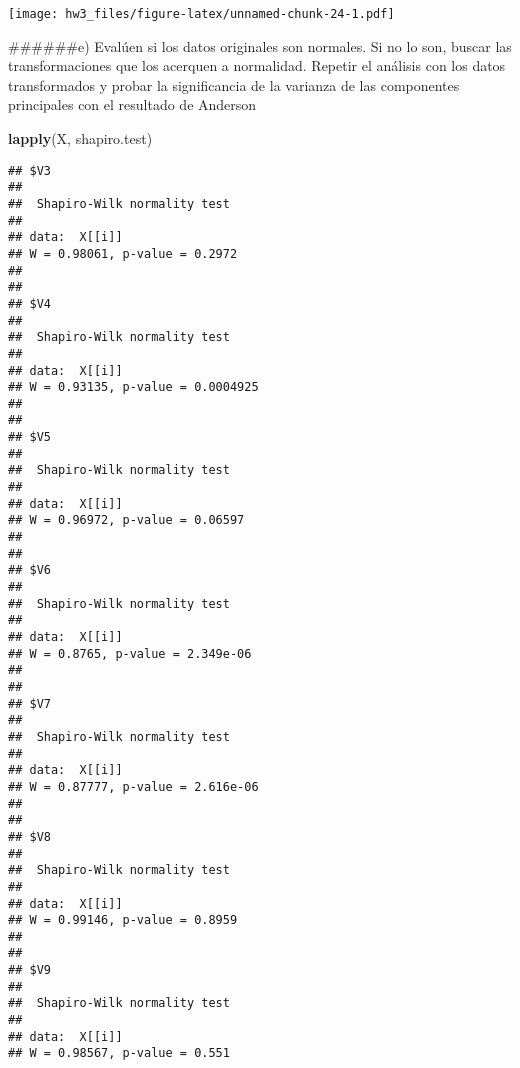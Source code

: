 \documentclass[]{article}
\newenvironment{Shaded}{\begin{snugshade}}{\end{snugshade}}
\newcommand{\ControlFlowTok}[1]{\textcolor[rgb]{0.13,0.29,0.53}{\textbf{#1}}}
\newcommand{\DataTypeTok}[1]{\textcolor[rgb]{0.13,0.29,0.53}{#1}}
\newcommand{\DecValTok}[1]{\textcolor[rgb]{0.00,0.00,0.81}{#1}}
\newcommand{\FloatTok}[1]{\textcolor[rgb]{0.00,0.00,0.81}{#1}}
\newcommand{\KeywordTok}[1]{\textcolor[rgb]{0.13,0.29,0.53}{\textbf{#1}}}
\newcommand{\NormalTok}[1]{#1}
\newcommand{\OperatorTok}[1]{\textcolor[rgb]{0.81,0.36,0.00}{\textbf{#1}}}
\newcommand{\OtherTok}[1]{\textcolor[rgb]{0.56,0.35,0.01}{#1}}
\newcommand{\StringTok}[1]{\textcolor[rgb]{0.31,0.60,0.02}{#1}}
\begin{document}
\begin{Shaded}
\end{Shaded}

\texttt{[image: hw3\_files/figure-latex/unnamed-chunk-24-1.pdf]}

\#\#\#\#\#\#e) Evalúen si los datos originales son normales. Si no lo
son, buscar las transformaciones que los acerquen a normalidad. Repetir
el análisis con los datos transformados y probar la significancia de la
varianza de las componentes principales con el resultado de Anderson

\begin{Shaded}
\begin{Highlighting}[]
\KeywordTok{lapply}\NormalTok{(X, shapiro.test)}
\end{Highlighting}
\end{Shaded}

\begin{verbatim}
## $V3
## 
##  Shapiro-Wilk normality test
## 
## data:  X[[i]]
## W = 0.98061, p-value = 0.2972
## 
## 
## $V4
## 
##  Shapiro-Wilk normality test
## 
## data:  X[[i]]
## W = 0.93135, p-value = 0.0004925
## 
## 
## $V5
## 
##  Shapiro-Wilk normality test
## 
## data:  X[[i]]
## W = 0.96972, p-value = 0.06597
## 
## 
## $V6
## 
##  Shapiro-Wilk normality test
## 
## data:  X[[i]]
## W = 0.8765, p-value = 2.349e-06
## 
## 
## $V7
## 
##  Shapiro-Wilk normality test
## 
## data:  X[[i]]
## W = 0.87777, p-value = 2.616e-06
## 
## 
## $V8
## 
##  Shapiro-Wilk normality test
## 
## data:  X[[i]]
## W = 0.99146, p-value = 0.8959
## 
## 
## $V9
## 
##  Shapiro-Wilk normality test
## 
## data:  X[[i]]
## W = 0.98567, p-value = 0.551
\end{verbatim}
\end{document}
